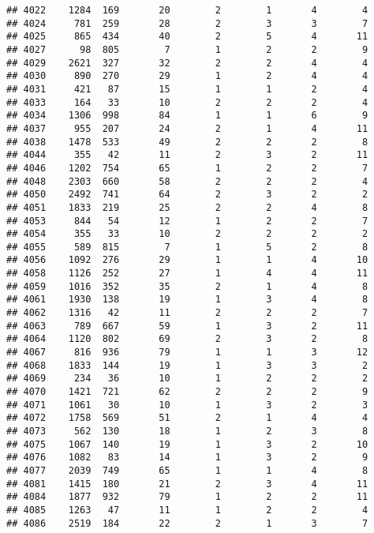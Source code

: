 \documentclass[]{article}
\begin{document}
\begin{verbatim}
## 4022    1284  169       20        2        1       4        4
## 4024     781  259       28        2        3       3        7
## 4025     865  434       40        2        5       4       11
## 4027      98  805        7        1        2       2        9
## 4029    2621  327       32        2        2       4        4
## 4030     890  270       29        1        2       4        4
## 4031     421   87       15        1        1       2        4
## 4033     164   33       10        2        2       2        4
## 4034    1306  998       84        1        1       6        9
## 4037     955  207       24        2        1       4       11
## 4038    1478  533       49        2        2       2        8
## 4044     355   42       11        2        3       2       11
## 4046    1202  754       65        1        2       2        7
## 4048    2303  660       58        2        2       2        4
## 4050    2492  741       64        2        3       2        2
## 4051    1833  219       25        2        2       4        8
## 4053     844   54       12        1        2       2        7
## 4054     355   33       10        2        2       2        2
## 4055     589  815        7        1        5       2        8
## 4056    1092  276       29        1        1       4       10
## 4058    1126  252       27        1        4       4       11
## 4059    1016  352       35        2        1       4        8
## 4061    1930  138       19        1        3       4        8
## 4062    1316   42       11        2        2       2        7
## 4063     789  667       59        1        3       2       11
## 4064    1120  802       69        2        3       2        8
## 4067     816  936       79        1        1       3       12
## 4068    1833  144       19        1        3       3        2
## 4069     234   36       10        1        2       2        2
## 4070    1421  721       62        2        2       2        9
## 4071    1061   30       10        1        3       2        3
## 4072    1758  569       51        2        1       4        4
## 4073     562  130       18        1        2       3        8
## 4075    1067  140       19        1        3       2       10
## 4076    1082   83       14        1        3       2        9
## 4077    2039  749       65        1        1       4        8
## 4081    1415  180       21        2        3       4       11
## 4084    1877  932       79        1        2       2       11
## 4085    1263   47       11        1        2       2        4
## 4086    2519  184       22        2        1       3        7

\end{verbatim}
\end{document}
